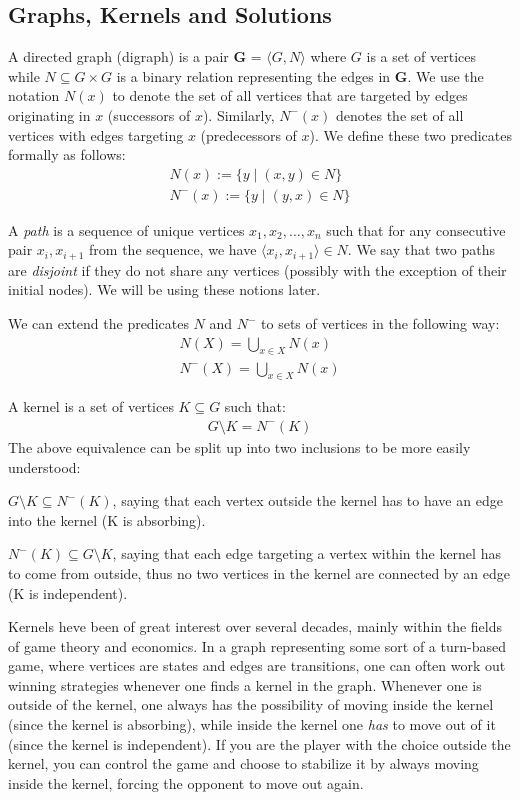 \subsection{Graphs, Kernels and Solutions}
\label{sub:Graphs, Kernels and Solution}
A directed graph (digraph) is a pair \textbf{G} = $\langle G,N \rangle$ where $G$ is a set of vertices while $N \subseteq G \times G$ is a binary relation representing the edges in \textbf{G}.
We use the notation $N(x)$ to denote the set of all vertices that are targeted by edges originating in $x$ (successors of $x$).
Similarly, $N^-(x)$ denotes the set of all vertices with edges targeting $x$ (predecessors of $x$).
We define these two predicates formally as follows:
\begin{align}
  N(x) := \{y \;|\; (x,y) \in N\}\\
  N^-(x) := \{ y \;|\; (y,x) \in N \}
\end{align}

A \textit{path} is a sequence of unique vertices $x_1,x_2,\dots,x_n$ such that for any consecutive pair $x_i,x_{i+1}$ from the sequence, we have $\langle x_i, x_{i+1} \rangle \in N$.
We say that two paths are \textit{disjoint} if they do not share any vertices (possibly with the exception of their initial nodes).
We will be using these notions later.

We can extend the predicates $N$ and $N^-$ to sets of vertices in the following way:
\begin{align}
  N(X) = \bigcup_{x \in X} N(x)\\
  N^-(X) = \bigcup_{x \in X} N(x)
\end{align}

A kernel is a set of vertices $K \subseteq G$ such that:
\begin{align}
  G \setminus K = N^-(K)
\end{align}
The above equivalence can be split up into two inclusions to be more easily understood:

$G \setminus K \subseteq N^-(K)$, saying that each vertex outside the kernel has to have an edge into the kernel (K is absorbing).

$N^-(K) \subseteq G \setminus K$, saying that each edge targeting a vertex within the kernel has to come from outside, thus no two vertices in the kernel are connected by an edge (K is independent).

Kernels heve been of great interest over several decades, mainly within the fields of game theory and economics\cite{neumann}.
In a graph representing some sort of a turn-based game, where vertices are states and edges are transitions, one can often work out winning strategies whenever one finds a kernel in the graph.
Whenever one is outside of the kernel, one always has the possibility of moving inside the kernel (since the kernel is absorbing), while inside the kernel one \textit{has} to move out of it (since the kernel is independent).
If you are the player with the choice outside the kernel, you can control the game and choose to stabilize it by always moving inside the kernel, forcing the opponent to move out again.

